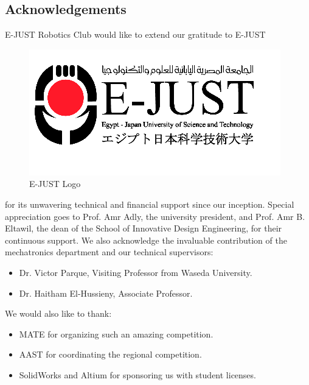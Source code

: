 \subsection{Acknowledgements}

E-JUST Robotics Club would like to extend our gratitude to E-JUST 
\begin{figure}[h]
  \centering
  \includegraphics[width=0.75\columnwidth]{Sections/6Conclusion/images/ejust_logo.png}
  \caption{E-JUST Logo}
  \label{fig:example2}
\end{figure}
for its unwavering technical and financial support since our inception. Special appreciation goes to Prof. Amr Adly, the university president, and Prof. Amr B. Eltawil, the dean of the School of Innovative Design Engineering, for their continuous support. We also acknowledge the invaluable contribution of the mechatronics department and our technical supervisors:
\begin{itemize}
    \setlength{\itemsep}{0pt}
    \item Dr. Victor Parque, Visiting Professor from Waseda University.
    \item Dr. Haitham El-Hussieny, Associate Professor.
\end{itemize}
We would also like to thank:
\begin{itemize}
    \setlength{\itemsep}{0pt}
    \item MATE for organizing such an amazing competition.
    \item AAST for coordinating the regional competition.
    \item SolidWorks and Altium for sponsoring us with student licenses.
\end{itemize}

